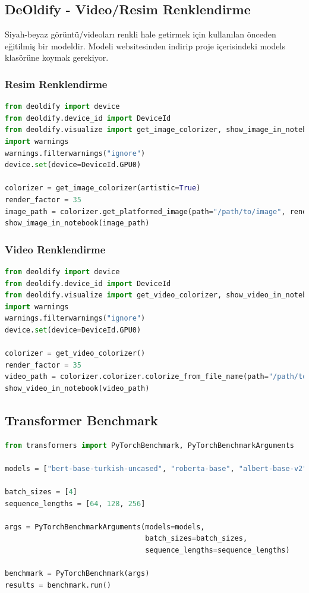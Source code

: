 \subsection{DeOldify - Video/Resim Renklendirme}
Siyah-beyaz görüntü/videoları renkli hale getirmek için kullanılan önceden eğitilmiş bir modeldir. Modeli websitesinden indirip proje içerisindeki models klasörüne koymak gerekiyor.

\subsubsection{Resim Renklendirme}
\begin{lstlisting}[language=Python]
from deoldify import device
from deoldify.device_id import DeviceId
from deoldify.visualize import get_image_colorizer, show_image_in_notebook
import warnings
warnings.filterwarnings("ignore")
device.set(device=DeviceId.GPU0)

colorizer = get_image_colorizer(artistic=True)
render_factor = 35
image_path = colorizer.get_platformed_image(path="/path/to/image", render_factor=render_factor, compare=False)
show_image_in_notebook(image_path)
\end{lstlisting}

\subsubsection{Video Renklendirme}
\begin{lstlisting}[language=Python]
from deoldify import device
from deoldify.device_id import DeviceId
from deoldify.visualize import get_video_colorizer, show_video_in_notebook
import warnings
warnings.filterwarnings("ignore")
device.set(device=DeviceId.GPU0)

colorizer = get_video_colorizer()
render_factor = 35
video_path = colorizer.colorizer.colorize_from_file_name(path="/path/to/video", render_factor=render_factor)
show_video_in_notebook(video_path)
\end{lstlisting}

\subsection{Transformer Benchmark}
\begin{lstlisting}[language=Python]
from transformers import PyTorchBenchmark, PyTorchBenchmarkArguments

models = ["bert-base-turkish-uncased", "roberta-base", "albert-base-v2"]

batch_sizes = [4]
sequence_lengths = [64, 128, 256]

args = PyTorchBenchmarkArguments(models=models,
                                 batch_sizes=batch_sizes,
                                 sequence_lengths=sequence_lengths)

benchmark = PyTorchBenchmark(args)
results = benchmark.run()
\end{lstlisting}


